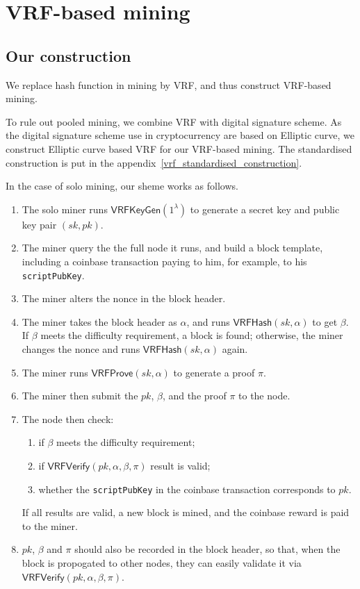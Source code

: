 \section{VRF-based mining}

\subsection{Our construction}

We replace hash function in mining by VRF, and thus construct VRF-based mining.

To rule out pooled mining, we combine VRF with digital signature scheme.
As the digital signature scheme use in cryptocurrency are based on Elliptic curve, we construct Elliptic curve based VRF for our VRF-based mining.
The standardised construction is put in the appendix~\ref{vrf_standardised_construction}.


In the case of solo mining, our sheme works as follows.

\begin{enumerate}
    \item The solo miner runs $\mathsf{VRFKeyGen}(1^{\lambda})$ to generate a secret key and public key pair $(sk, pk)$.
    \item The miner query the the full node it runs, and build a block template, including a coinbase transaction paying to him, for example, to his \texttt{scriptPubKey}.
    \item The miner alters the nonce in the block header.
    \item The miner takes the block header as $\alpha$, and runs $\mathsf{VRFHash}(sk, \alpha)$ to get $\beta$. If $\beta$ meets the difficulty requirement, a block is found; otherwise, the miner changes the nonce and runs $\mathsf{VRFHash}(sk, \alpha)$ again.
    \item The miner runs $\mathsf{VRFProve}(sk, \alpha)$ to generate a proof $\pi$.
    \item The miner then submit the $pk$, $\beta$, and the proof $\pi$ to the node.
    \item The node then check:
        \begin{enumerate}
            \item if $\beta$ meets the difficulty requirement;
            \item if $\mathsf{VRFVerify}(pk, \alpha, \beta, \pi)$ result is valid;
            \item whether the \texttt{scriptPubKey} in the coinbase transaction corresponds to $pk$.
        \end{enumerate}
        If all results are valid, a new block is mined, and the coinbase reward is paid to the miner.
    \item $pk$, $\beta$ and $\pi$ should also be recorded in the block header, so that, when the block is propogated to other nodes, they can easily validate it via $\mathsf{VRFVerify}(pk, \alpha, \beta, \pi)$.
\end{enumerate}

